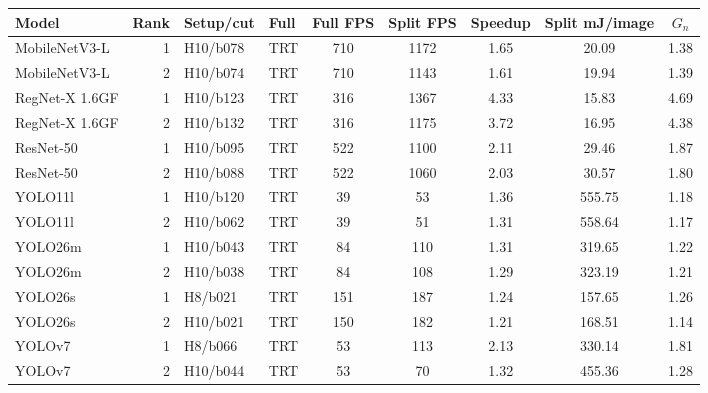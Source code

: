 \begin{tabular}{l r l l S[table-format=4.0] S[table-format=4.0] S[table-format=2.2] S[table-format=4.2] S[table-format=2.2]}
\toprule
Model & Rank & Setup/cut & Full & {Full FPS} & {Split FPS} & {Speedup} & {Split mJ/image} & {$G_n$} \\
\midrule
MobileNetV3-L & 1 & H10/b078 & TRT & 710 & 1172 & 1.65 & 20.09 & 1.38 \\
MobileNetV3-L & 2 & H10/b074 & TRT & 710 & 1143 & 1.61 & 19.94 & 1.39 \\
RegNet-X 1.6GF & 1 & H10/b123 & TRT & 316 & 1367 & 4.33 & 15.83 & 4.69 \\
RegNet-X 1.6GF & 2 & H10/b132 & TRT & 316 & 1175 & 3.72 & 16.95 & 4.38 \\
ResNet-50 & 1 & H10/b095 & TRT & 522 & 1100 & 2.11 & 29.46 & 1.87 \\
ResNet-50 & 2 & H10/b088 & TRT & 522 & 1060 & 2.03 & 30.57 & 1.80 \\
YOLO11l & 1 & H10/b120 & TRT & 39 & 53 & 1.36 & 555.75 & 1.18 \\
YOLO11l & 2 & H10/b062 & TRT & 39 & 51 & 1.31 & 558.64 & 1.17 \\
YOLO26m & 1 & H10/b043 & TRT & 84 & 110 & 1.31 & 319.65 & 1.22 \\
YOLO26m & 2 & H10/b038 & TRT & 84 & 108 & 1.29 & 323.19 & 1.21 \\
YOLO26s & 1 & H8/b021 & TRT & 151 & 187 & 1.24 & 157.65 & 1.26 \\
YOLO26s & 2 & H10/b021 & TRT & 150 & 182 & 1.21 & 168.51 & 1.14 \\
YOLOv7 & 1 & H8/b066 & TRT & 53 & 113 & 2.13 & 330.14 & 1.81 \\
YOLOv7 & 2 & H10/b044 & TRT & 53 & 70 & 1.32 & 455.36 & 1.28 \\
\bottomrule
\end{tabular}
